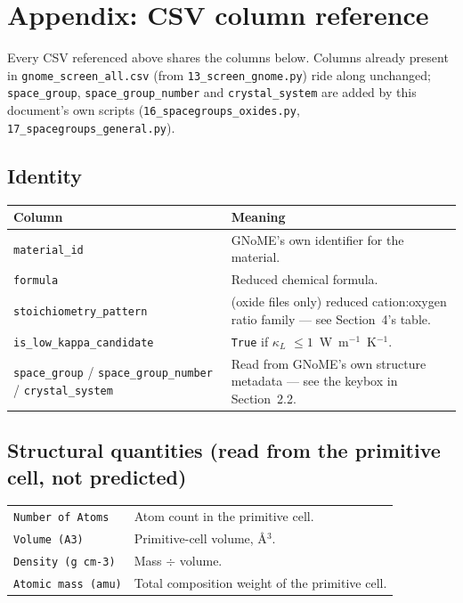 \documentclass[11pt,a4paper]{article}
\newcommand{\KL}{$\kappa_L$}
\begin{document}
\clearpage
\appendix
\section{Appendix: CSV column reference}

Every CSV referenced above shares the columns below. Columns already present
in \texttt{gnome\_screen\_all.csv} (from \texttt{13\_screen\_gnome.py}) ride
along unchanged; \texttt{space\_group}, \texttt{space\_group\_number} and
\texttt{crystal\_system} are added by this document's own scripts
(\texttt{16\_spacegroups\_oxides.py}, \texttt{17\_spacegroups\_general.py}).

\subsection*{Identity}
\begin{center}
\begin{tabular}{p{4.4cm}p{7.6cm}}
\toprule
Column & Meaning \\
\midrule
\texttt{material\_id} & GNoME's own identifier for the material. \\
\texttt{formula} & Reduced chemical formula. \\
\texttt{stoichiometry\_pattern} & (oxide files only) reduced cation:oxygen
  ratio family --- see Section~4's table. \\
\texttt{is\_low\_kappa\_candidate} & \texttt{True} if \KL{} $\leq 1$~W~m$^{-1}$~K$^{-1}$. \\
\texttt{space\_group} / \texttt{space\_group\_number} / \texttt{crystal\_system}
  & Read from GNoME's own structure metadata --- see the keybox in Section~2.2. \\
\bottomrule
\end{tabular}
\end{center}

\subsection*{Structural quantities (read from the primitive cell, not predicted)}
\begin{center}
\begin{tabular}{p{4.4cm}p{7.6cm}}
\toprule
\texttt{Number of Atoms} & Atom count in the primitive cell. \\
\texttt{Volume (A3)} & Primitive-cell volume, \AA$^3$. \\
\texttt{Density (g cm-3)} & Mass $\div$ volume. \\
\texttt{Atomic mass (amu)} & Total composition weight of the primitive cell. \\
\bottomrule
\end{tabular}
\end{center}
\end{document}
